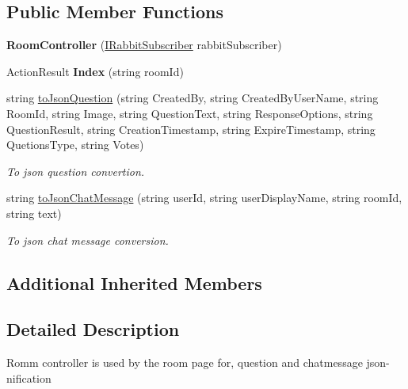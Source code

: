 \subsection*{Public Member Functions}
\begin{DoxyCompactItemize}
\item 
\hypertarget{class_wis_r_1_1_controllers_1_1_room_controller_aebb6819de16a51bb636d5d058a9fbf3e}{}{\bfseries Room\+Controller} (\hyperlink{interface_wis_r_1_1_providers_1_1_i_rabbit_subscriber}{I\+Rabbit\+Subscriber} rabbit\+Subscriber)\label{class_wis_r_1_1_controllers_1_1_room_controller_aebb6819de16a51bb636d5d058a9fbf3e}

\item 
\hypertarget{class_wis_r_1_1_controllers_1_1_room_controller_a1eb8928cebd666c6b984c85b6fd0a5fa}{}Action\+Result {\bfseries Index} (string room\+Id)\label{class_wis_r_1_1_controllers_1_1_room_controller_a1eb8928cebd666c6b984c85b6fd0a5fa}

\item 
string \hyperlink{class_wis_r_1_1_controllers_1_1_room_controller_af3386a8cccb0b9828edc5c995dc6e7b2}{to\+Json\+Question} (string Created\+By, string Created\+By\+User\+Name, string Room\+Id, string Image, string Question\+Text, string Response\+Options, string Question\+Result, string Creation\+Timestamp, string Expire\+Timestamp, string Quetions\+Type, string Votes)
\begin{DoxyCompactList}\small\item\em To json question convertion. \end{DoxyCompactList}\item 
string \hyperlink{class_wis_r_1_1_controllers_1_1_room_controller_ab2268139644f3293b3a0192e0dd4eed5}{to\+Json\+Chat\+Message} (string user\+Id, string user\+Display\+Name, string room\+Id, string text)
\begin{DoxyCompactList}\small\item\em To json chat message conversion. \end{DoxyCompactList}\end{DoxyCompactItemize}
\subsection*{Additional Inherited Members}


\subsection{Detailed Description}
Romm controller is used by the room page for, question and chatmessage json-\/nification 



